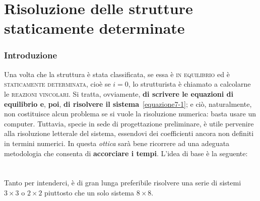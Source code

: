 \clearpage
\pagestyle{fancy}
\part{Risoluzione delle strutture staticamente determinate}
\setcounter{section}{0}
\section{Introduzione}
Una volta che la struttura è stata classificata, se essa è \textsc{in equilibrio} ed è \textsc{staticamente determinata}, cioè se $i=0$, lo strutturista è chiamato a calcolarne le \textsc{reazioni vincolari}. Si tratta, ovviamente, \textbf{di scrivere le equazioni di equilibrio e}, \textbf{poi}, \textbf{di risolvere il sistema}~\eqref{equazione7-1}; e ciò, naturalmente, non costituisce alcun problema se si vuole la risoluzione numerica: basta usare un computer. Tuttavia, specie in sede di progettazione preliminare, è utile pervenire alla risoluzione letterale del sistema, essendovi dei coefficienti ancora non definiti in termini numerici. In questa \emph{ottica} sarà bene ricorrere ad una adeguata metodologia che consenta di \textbf{accorciare i tempi}. L'idea di base è la seguente: 
\\

\\
\\

\noindent Tanto per intenderci, è di gran lunga preferibile risolvere una serie di sistemi $3\times 3$ o $2\times 2$ piuttosto che un solo sistema $8\times 8$. 
